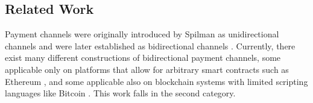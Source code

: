 \documentclass[runningheads]{llncs}
\newcommand{\authnote}[3]{{ \footnotesize \bf{#1[#2: #3]~}}} %
\newcommand{\edit}[1]{\authnote{\color{blue}}{edit}{#1}}
\newcommand{\sys}{\textsc{Cerberus}\xspace}
\begin{document}

\subsection{Related Work}
\label{sec:related}
Payment channels were originally introduced by Spilman \cite{spilman2013channels} as unidirectional channels and were later established as bidirectional channels \cite{poon2015lightning,decker15fast}. Currently, there exist many different constructions of bidirectional payment channels, some applicable only on platforms that allow for arbitrary smart contracts such as Ethereum \cite{dziembowski2017perun,Miller2017sprites,green2017bolt,avarikioti2019brick}, and some applicable also on blockchain systems with limited scripting languages like Bitcoin \cite{poon2015lightning,deckereltoo,decker15fast,avarikioti2018watchtowers}. This work falls in the second category.
\end{document}
